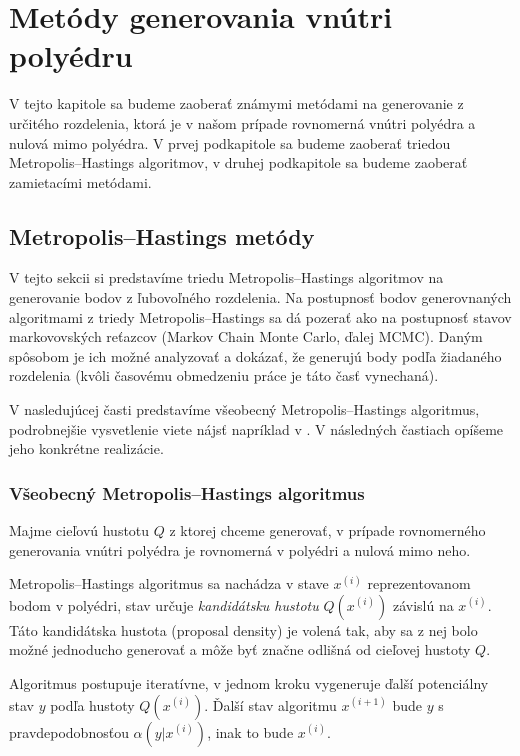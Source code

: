 \chapter{Metódy generovania vnútri polyédru}

V tejto kapitole sa budeme zaoberať známymi metódami na generovanie z určitého rozdelenia, ktorá je v našom prípade rovnomerná vnútri polyédra a nulová mimo polyédra. V prvej podkapitole sa budeme zaoberať triedou Metropolis--Hastings algoritmov, v druhej podkapitole sa budeme zaoberať zamietacími metódami.

\section{Metropolis--Hastings metódy}

V tejto sekcii si predstavíme triedu Metropolis--Hastings algoritmov na generovanie bodov z ľubovoľného rozdelenia. Na postupnosť bodov generovnaných algoritmami z triedy Metropolis--Hastings sa dá pozerať ako na postupnosť stavov markovovských reťazcov (Markov Chain Monte Carlo, ďalej MCMC). Daným spôsobom je ich možné analyzovať a dokázať, že generujú body podľa žiadaného rozdelenia (kvôli časovému obmedzeniu práce je táto časť vynechaná).

V nasledujúcej časti predstavíme  všeobecný Metropolis--Hastings algoritmus, podrobnejšie vysvetlenie viete nájsť napríklad v \cite{metropolis-hastings_chib}. V následných častiach opíšeme jeho konkrétne realizácie.

\subsection{Všeobecný Metropolis--Hastings algoritmus}

Majme cieľovú hustotu $Q$ z ktorej chceme generovať, v prípade rovnomerného generovania vnútri polyédra je rovnomerná v polyédri a nulová mimo neho.

Metropolis--Hastings algoritmus \cite{metropolis-hastings_chib} sa nachádza v stave $x^{(i)}$ reprezentovanom bodom v polyédri, stav určuje \textit{kandidátsku hustotu} $Q(x^{(i)})$ závislú na $x^{(i)}$. Táto kandidátska hustota (proposal density) je volená tak, aby sa z nej bolo možné jednoducho generovať a môže byť značne odlišná od cieľovej hustoty $Q$.

Algoritmus postupuje iteratívne, v jednom kroku vygeneruje ďalší potenciálny stav $y$ podľa hustoty $Q(x^{(i)})$. Ďalší stav algoritmu $x^{(i+1)}$ bude $y$ s pravdepodobnosťou $\alpha (y|x^{(i)})$, inak to bude $x^{(i)}$.

